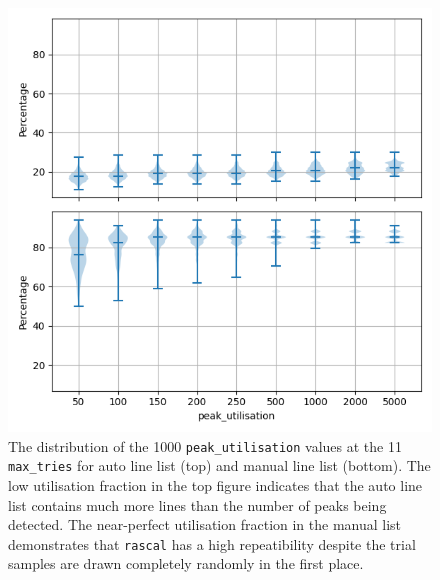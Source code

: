 \documentclass{aa}
\begin{document}
\begin{figure}[h]
    \centering
    \includegraphics[width=\columnwidth]{figure_4_peak_utilisation.png}
    \caption{The distribution of the 1000 \texttt{peak\_utilisation} values at the 11 \texttt{max\_tries} for auto line list (top) and manual line list (bottom). The low utilisation fraction in the top figure indicates that the auto line list contains much more lines than the number of peaks being detected. The near-perfect utilisation fraction in the manual list demonstrates that \texttt{rascal} has a high repeatibility despite the trial samples are drawn completely randomly in the first place.}
    \label{fig:peak_utilisation}
\end{figure}
\end{document}
